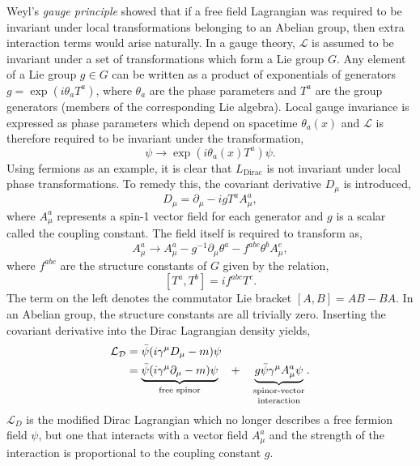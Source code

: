 Weyl's \textit{gauge principle} showed that if a free field Lagrangian was required to be invariant under local transformations belonging to an Abelian group, then extra interaction terms would arise naturally.
In a gauge theory, $\mathcal{L}$ is assumed to be invariant under a set of transformations which form a Lie group $G$.
Any element of a Lie group $g \in G$ can be written as a product of exponentials of generators $g = \exp(i \theta_a T^a)$, where $\theta_a$ are the phase parameters and $T^a$ are the group generators (members of the corresponding Lie algebra).
Local gauge invariance is expressed as phase parameters which depend on spacetime $\theta_a(x)$ and $\mathcal{L}$ is therefore required to be invariant under the transformation,
\begin{equation}
    \label{eq:local_gauge_invariance}
    \psi \rightarrow \exp\left(i \theta_a(x) T^a\right) \psi.
\end{equation}
Using fermions as an example, it is clear that $L_\text{Dirac}$ is not invariant under local phase transformations.
To remedy this, the covariant derivative $D_\mu$ is introduced,
\begin{equation}
    \label{eq:covariant_derivative}
    D_\mu = \partial_\mu - i g T^a A_\mu^a,
\end{equation}
where $A_\mu^a$ represents a spin-1 vector field for each generator and $g$ is a scalar called the coupling constant.
The field itself is required to transform as,
\begin{equation}
    \label{eq:gauge_transformation}
    A_\mu^a \rightarrow A_\mu^a - g^{-1} \partial_\mu \theta^a - f^{abc} \theta^b A_\mu^c,
\end{equation}
where $f^{abc}$ are the structure constants of $G$ given by the relation,
\begin{equation}
    \label{eq:structure_constants}
    [T^a, T^b] = i f^{abc} T^c.
\end{equation}
The term on the left denotes the commutator Lie bracket $[A, B] = AB - BA$.
In an Abelian group, the structure constants are all trivially zero.
Inserting the covariant derivative into the Dirac Lagrangian density yields,
\begin{align}
    \label{eq:dirac_lagrangian_gauge}
    \mathcal{L_D} & = \bar \psi (i \gamma^\mu D_\mu - m) \psi                                                                                                                                       \\
                  & = \underbrace{\bar \psi (i \gamma^\mu \partial_\mu - m) \psi}_\text{free spinor} \quad + \quad \underbrace{g \bar \psi \gamma^\mu A_\mu^a \psi}_\text{\shortstack{spinor-vector \\interaction}}.
\end{align}
$\mathcal{L}_D$ is the modified Dirac Lagrangian which no longer describes a free fermion field $\psi$, but one that interacts with a vector field $A_\mu^a$ and the strength of the interaction is proportional to the coupling constant $g$.

